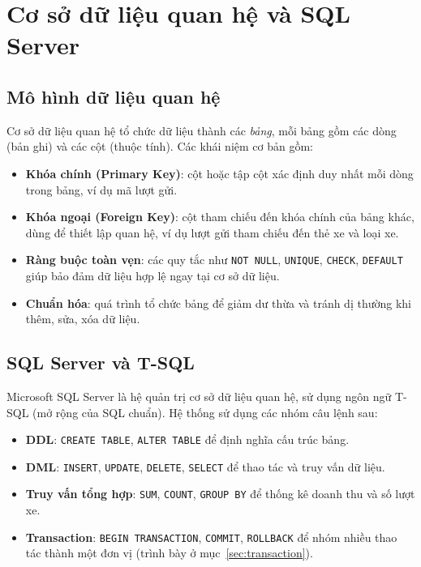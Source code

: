 \section{Cơ sở dữ liệu quan hệ và SQL Server}

\subsection{Mô hình dữ liệu quan hệ}

Cơ sở dữ liệu quan hệ tổ chức dữ liệu thành các \textit{bảng}, mỗi bảng gồm các dòng (bản ghi) và các cột (thuộc tính). Các khái niệm cơ bản gồm:

\begin{itemize}
  \item \textbf{Khóa chính (Primary Key)}: cột hoặc tập cột xác định duy nhất mỗi dòng trong bảng, ví dụ mã lượt gửi.
  \item \textbf{Khóa ngoại (Foreign Key)}: cột tham chiếu đến khóa chính của bảng khác, dùng để thiết lập quan hệ, ví dụ lượt gửi tham chiếu đến thẻ xe và loại xe.
  \item \textbf{Ràng buộc toàn vẹn}: các quy tắc như \texttt{NOT NULL}, \texttt{UNIQUE}, \texttt{CHECK}, \texttt{DEFAULT} giúp bảo đảm dữ liệu hợp lệ ngay tại cơ sở dữ liệu.
  \item \textbf{Chuẩn hóa}: quá trình tổ chức bảng để giảm dư thừa và tránh dị thường khi thêm, sửa, xóa dữ liệu.
\end{itemize}

\subsection{SQL Server và T-SQL}

Microsoft SQL Server là hệ quản trị cơ sở dữ liệu quan hệ, sử dụng ngôn ngữ T-SQL (mở rộng của SQL chuẩn). Hệ thống sử dụng các nhóm câu lệnh sau:

\begin{itemize}
  \item \textbf{DDL}: \texttt{CREATE TABLE}, \texttt{ALTER TABLE} để định nghĩa cấu trúc bảng.
  \item \textbf{DML}: \texttt{INSERT}, \texttt{UPDATE}, \texttt{DELETE}, \texttt{SELECT} để thao tác và truy vấn dữ liệu.
  \item \textbf{Truy vấn tổng hợp}: \texttt{SUM}, \texttt{COUNT}, \texttt{GROUP BY} để thống kê doanh thu và số lượt xe.
  \item \textbf{Transaction}: \texttt{BEGIN TRANSACTION}, \texttt{COMMIT}, \texttt{ROLLBACK} để nhóm nhiều thao tác thành một đơn vị (trình bày ở mục~\ref{sec:transaction}).
\end{itemize}

